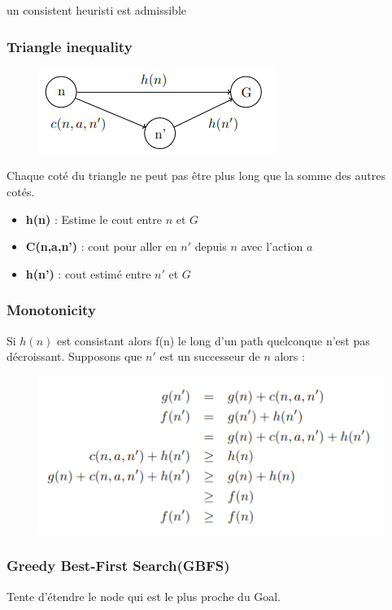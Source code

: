 		un consistent heuristi est admissible
		
		\subsubsection{Triangle inequality}
			\begin{figure}[htp]
				\centering
				\includegraphics[scale=1]{img/Triangle.png}
			\end{figure}
			Chaque coté du triangle ne peut pas être plus long que la somme des autres cotés.
			\begin{itemize}
				\item \textbf{h(n)} : Estime le cout entre $n$ et $G$
				\item \textbf{C(n,a,n')} : cout pour aller en $n'$ depuis $n$ avec l'action $a$
				\item \textbf{h(n')} : cout estimé entre $n'$ et $G$
			\end{itemize}
			
		\subsubsection{Monotonicity} 
			Si $h(n)$ est consistant alors f(n) le long d'un path quelconque n'est pas décroissant. Supposons que $n'$ est un successeur de $n$ alors :
			
			\begin{figure}[htp]
				\centering
				\includegraphics[scale=1]{img/Monotonicité.png}
			\end{figure}
		\subsubsection{Greedy Best-First Search(GBFS)}
			Tente d'étendre le node qui est le plus proche du Goal.
			
